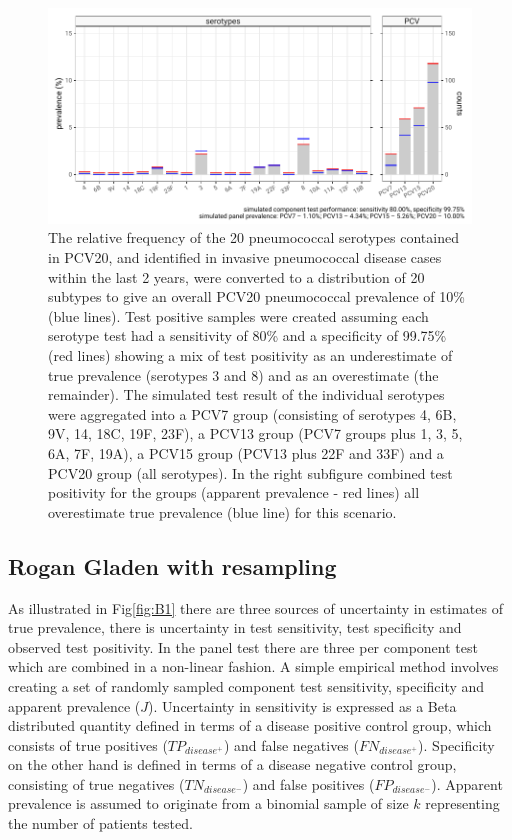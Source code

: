 \documentclass[a4paper, 12pt, twoside]{article}
\let\Oldsubsection\subsection
\renewcommand{\subsection}{\FloatBarrier\Oldsubsection}
\begin{document}
\begin{figure}[h!]
\centering
  \includegraphics{fig/simulation_setup_prev_10_v2}
  \caption{The relative frequency of the 20 pneumococcal serotypes contained in PCV20, and identified in invasive pneumococcal disease cases within the last 2 years, were converted to a distribution of 20 subtypes to give an overall PCV20 pneumococcal prevalence of 10\% (blue lines). Test positive samples were created assuming each serotype test had a sensitivity of 80\% and a specificity of 99.75\% (red lines) showing a mix of test positivity as an underestimate of true prevalence (serotypes 3 and 8) and as an overestimate (the remainder). The simulated test result of the individual serotypes were aggregated into a PCV7 group (consisting of serotypes 4, 6B, 9V, 14, 18C, 19F, 23F), a PCV13 group (PCV7 groups plus 1, 3, 5, 6A, 7F, 19A), a PCV15 group (PCV13 plus 22F and 33F) and a PCV20 group (all serotypes). In the right subfigure combined test positivity for the groups (apparent prevalence - red lines) all overestimate true prevalence (blue line) for this scenario.}
\label{fig:B2}
\end{figure}

\subsection{Rogan Gladen with resampling}

As illustrated in Fig\ref{fig:B1} there are three sources of uncertainty in estimates of true prevalence, there is uncertainty in test sensitivity, test specificity and observed test positivity. In the panel test there are three per component test which are combined in a non-linear fashion. A simple empirical method involves creating a set of randomly sampled component test sensitivity, specificity and apparent prevalence (\(J\)). Uncertainty in sensitivity is expressed as a Beta distributed quantity defined in terms of a disease positive control group, which consists of true positives (\(TP_{disease^+}\)) and false negatives (\(FN_{disease^+}\)). Specificity on the other hand is defined in terms of a disease negative control group, consisting of true negatives (\(TN_{disease^-}\)) and false positives (\(FP_{disease^-}\)). Apparent prevalence is assumed to originate from a binomial sample of size \(k\) representing the number of patients tested.
\end{document}
